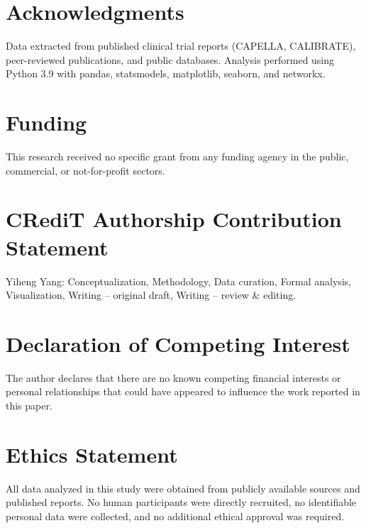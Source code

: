 \documentclass[12pt,a4paper]{article}
\begin{document}
\section*{Acknowledgments}
Data extracted from published clinical trial reports (CAPELLA, CALIBRATE), peer-reviewed publications, and public databases. Analysis performed using Python 3.9 with pandas, statsmodels, matplotlib, seaborn, and networkx.

\section*{Funding}
This research received no specific grant from any funding agency in the public, commercial, or not-for-profit sectors.

\section*{CRediT Authorship Contribution Statement}
Yiheng Yang: Conceptualization, Methodology, Data curation, Formal analysis, Visualization, Writing -- original draft, Writing -- review \& editing.

\section*{Declaration of Competing Interest}
The author declares that there are no known competing financial interests or personal relationships that could have appeared to influence the work reported in this paper.

\section*{Ethics Statement}
All data analyzed in this study were obtained from publicly available sources and published reports. No human participants were directly recruited, no identifiable personal data were collected, and no additional ethical approval was required.
\end{document}
